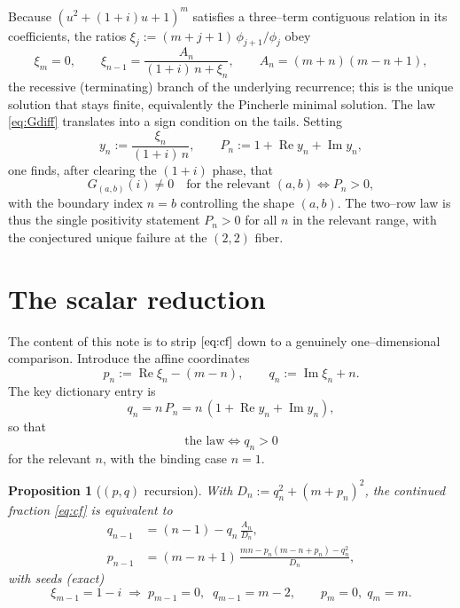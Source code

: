\documentclass[11pt]{article}
\newtheorem{proposition}{Proposition}
\theoremstyle{definition}
\renewcommand{\Re}{\operatorname{Re}}
\renewcommand{\Im}{\operatorname{Im}}
\begin{document}
Because $(u^2+(1+i)u+1)^m$ satisfies a three--term contiguous relation in its
coefficients, the ratios $\xi_j:=(m+j+1)\,\phi_{j+1}/\phi_j$ obey
\begin{equation}\label{eq:cf}
  \xi_m=0,
  \qquad
  \xi_{n-1}=\frac{A_n}{(1+i)\,n+\xi_n},
  \qquad A_n=(m+n)(m-n+1),
\end{equation}
the recessive (terminating) branch of the underlying recurrence; this is the
unique solution that stays finite, equivalently the Pincherle minimal solution.
The law \eqref{eq:Gdiff} translates into a sign condition on the tails. Setting
\[
  y_n := \frac{\xi_n}{(1+i)\,n},
  \qquad
  P_n := 1 + \Re y_n + \Im y_n,
\]
one finds, after clearing the $(1+i)$ phase, that
\begin{equation}\label{eq:lawP}
  G_{(a,b)}(i)\ne0 \quad\text{for the relevant }(a,b)
  \iff
  P_n>0 ,
\end{equation}
with the boundary index $n=b$ controlling the shape $(a,b)$. The two--row law is
thus the single positivity statement $P_n>0$ for all $n$ in the relevant range,
with the conjectured unique failure at the $(2,2)$ fiber.

\section{The scalar reduction}\label{sec:reduction}

The content of this note is to strip $\eqref{eq:cf}$ down to a genuinely
one--dimensional comparison. Introduce the affine coordinates
\begin{equation}\label{eq:pq}
  p_n := \Re\xi_n - (m-n),
  \qquad
  q_n := \Im\xi_n + n .
\end{equation}
The key dictionary entry is
\[
  q_n = n\,P_n = n\,(1+\Re y_n+\Im y_n),
\]
so that
\begin{equation}\label{eq:lawq}
  \boxed{\;\text{the law}\iff q_n>0\;}
\end{equation}
for the relevant $n$, with the binding case $n=1$.

\begin{proposition}[$(p,q)$ recursion]\label{prop:rec}
With $D_n:=q_n^2+(m+p_n)^2$, the continued fraction \eqref{eq:cf} is equivalent to
\begin{align}
  q_{n-1} &= (n-1) - q_n\,\frac{A_n}{D_n},\label{eq:qrec}\\
  p_{n-1} &= (m-n+1)\,\frac{m n - p_n(m-n+p_n) - q_n^2}{D_n},\label{eq:prec}
\end{align}
with seeds (exact)
\[
  \xi_{m-1}=1-i\;\Longrightarrow\;p_{m-1}=0,\;\;q_{m-1}=m-2,
  \qquad p_m=0,\;q_m=m.
\]
\end{proposition}
\end{document}
